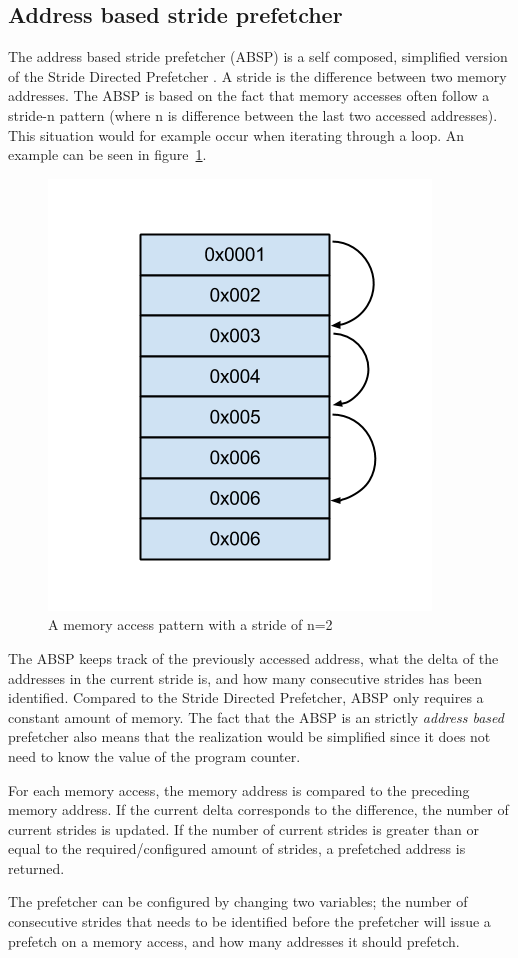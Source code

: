 \subsection{Address based stride prefetcher}
\label{sec:stridePrefetcher}
The address based stride prefetcher (ABSP) is a self composed, simplified version of
the Stride Directed Prefetcher \cite{stride}. A stride is the difference between two memory addresses. The ABSP is based on the fact that
memory accesses often follow a stride-n pattern (where n is difference between the last two accessed addresses). This situation would for example occur when iterating through a loop. An example can be seen in figure~\ref{fig:stride}.

\begin{figure}[H]
\centerline{\includegraphics[scale=0.5]{./figures/stride}}
\caption{A memory access pattern with a stride of n=2}
\label{fig:stride}
\end{figure}

The ABSP keeps track of the previously accessed address, what the delta of the addresses in the current stride is, and
how many consecutive strides has been identified. Compared to the Stride Directed Prefetcher, ABSP only requires a constant amount of memory. The fact that the ABSP is an strictly \emph{address based} prefetcher also means that the realization would be simplified since it does not need to know the value of the program counter.

For each memory access, the memory address is compared to the preceding
memory address. If the current delta corresponds to the
difference, the number of current strides is updated. If the number of
current strides is greater than or equal to the required/configured
amount of strides, a prefetched address is returned.  

The prefetcher can be configured by changing two variables;
the number of consecutive strides that needs to be identified before
the prefetcher will issue a prefetch on a memory access, and how many addresses it should prefetch.


